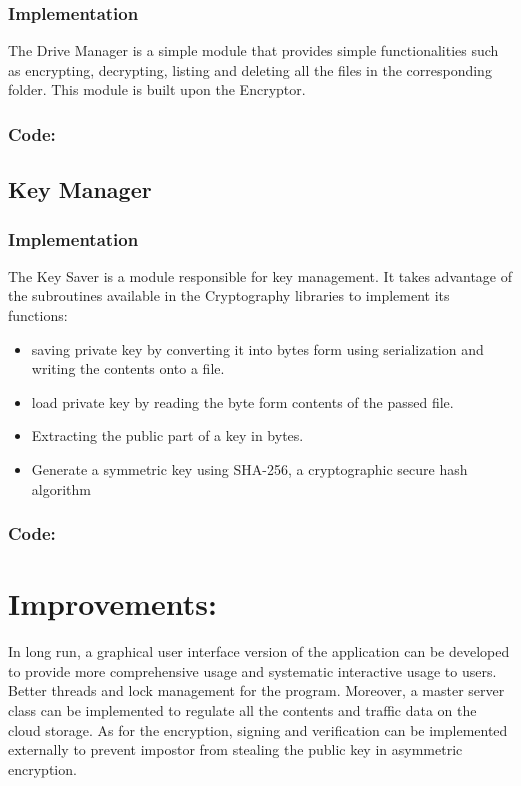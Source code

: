 \documentclass[12pt]{article}
\begin{document}
\subsubsection*{Implementation}
The Drive Manager is a simple module that provides simple functionalities such as encrypting, decrypting, listing and deleting all the files in the corresponding folder. This module is built upon the Encryptor. 
\vspace*{10mm}
\subsubsection*{Code:}

\newpage
\subsection*{Key Manager}
\subsubsection*{Implementation}
The Key Saver is a module responsible for key management. It takes advantage of the subroutines available in the Cryptography libraries to implement its functions:
\begin{itemize}
\item saving private key by converting it into bytes form using serialization and writing the contents onto a file.
\item load private key by reading the byte form contents of the passed file.
\item Extracting the public part of a key in bytes.
\item Generate a symmetric key using SHA-256, a cryptographic secure hash algorithm 
\end{itemize}
\vspace*{10mm}
\subsubsection*{Code:}
 
\vspace*{30mm}
\section*{Improvements:}
In long run, a graphical user interface version of the application can be developed to provide more comprehensive usage and systematic interactive usage to users. Better threads and lock management for the program. Moreover, a master server class can be implemented to regulate all the  contents and traffic data on the cloud storage. As for the encryption, signing and verification can be implemented externally to prevent impostor from stealing the public key in asymmetric encryption. 
\end{document}
